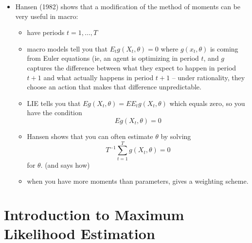 \begin{itemize}
\item Hansen (1982) shows that a modification of the method of
         moments can be very useful in macro:
\begin{itemize}
\item have periods $t=1,\dots,T$
\item macro models tell you that $E_t g(X_t, \theta) = 0$ where
           $g(x_t, \theta)$ is coming from Euler equations (ie, an
           agent is optimizing in period $t$, and $g$ captures the
           difference between what they expect to happen in period
           $t+1$ and what actually happens in period $t+1$ -- under
           rationality, they choose an action that makes that
           difference unpredictable.
\item LIE tells you that $E g(X_t, \theta) = E E_t g(X_t,\theta)$
           which equals zero, so you have the condition
           \[E g(X_t, \theta) = 0\]
\item Hansen shows that you can often estimate $\theta$ by solving
           \[ T^{-1} \sum_{t=1}^T g(X_t,\theta) = 0 \]
           for $\theta$. (and says how)
\item when you have more moments than parameters, gives a
           weighting scheme.
\end{itemize}
\end{itemize}

\section{Introduction to Maximum Likelihood Estimation}

